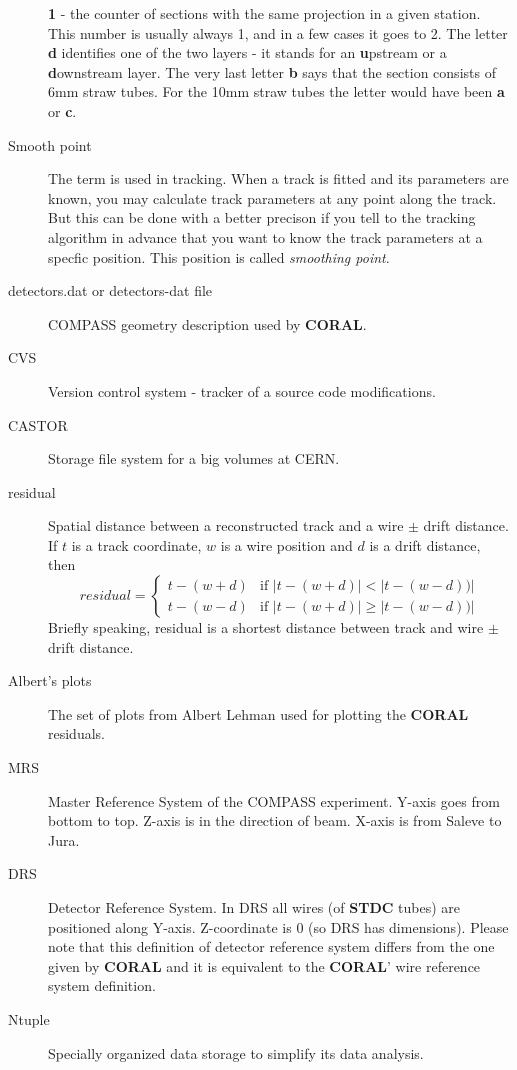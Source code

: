 \documentclass[a4paper,12pt]{article}
\begin{document}
\begin{description}
        {\bf 1} - the counter of sections with the same projection in a given station.
        This number is usually always 1, and in a few cases it goes to 2.
        The letter {\bf d} identifies one of the two layers - it stands for an
        {\bf u}pstream or a {\bf d}ownstream layer. The very last letter {\bf b}
        says that the section
        consists of 6mm straw tubes. For the 10mm straw tubes the letter would have been
        {\bf a} or {\bf c}.
\item[Smooth point] The term is used in tracking. When a track is fitted and its parameters
        are known, you may calculate track parameters at any point along the track. But this can
        be done with a better precison if you tell to the tracking algorithm in advance that you want
        to know the track parameters at a specfic position. This position is called {\it smoothing point}.
\item[detectors.dat or detectors-dat file] COMPASS geometry description used by {\bf CORAL}.
\item[CVS] Version control system - tracker of a source code modifications.
\item[CASTOR] Storage file system for a big volumes at CERN.
\item[residual] Spatial distance between a reconstructed track and a wire $\pm$ drift distance.
      If $t$ is a track coordinate, $w$ is a wire position and $d$ is a drift distance, then
      $$residual = \left\{
        \begin{array}{ll}
            t-(w+d) & \mbox{if  } |t-(w+d)|<|t-(w-d))| \\
            t-(w-d) & \mbox{if  } |t-(w+d)|\geq|t-(w-d))|
        \end{array}
        \right.
      $$
      Briefly speaking, residual is a shortest distance between track and wire $\pm$ drift distance.
\item[Albert's plots] The set of plots from Albert Lehman used for plotting the {\bf CORAL} residuals.
\item[MRS] Master Reference System of the COMPASS experiment. Y-axis goes from bottom to top.
         Z-axis is in the direction of beam. X-axis is from Saleve to Jura.
\item[DRS] Detector Reference System. In DRS all wires (of {\bf STDC} tubes) are positioned along Y-axis.
         Z-coordinate is 0 (so DRS has dimensions). Please note that this definition of detector 
         reference system differs from the one given by {\bf CORAL} and it is equivalent to the {\bf CORAL}' wire 
         reference system definition.
\item[Ntuple] Specially organized data storage to simplify its data analysis.
\end{description}
\end{document}
